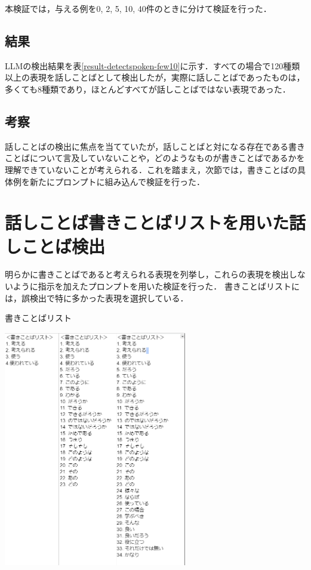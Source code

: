 本検証では，与える例を0, 2, 5, 10, 40件のときに分けて検証を行った．

\subsection{結果}
LLMの検出結果を表\ref{result-detectspoken-few10}に示す．すべての場合で120種類以上の表現を話しことばとして検出したが，実際に話しことばであったものは，多くても8種類であり，ほとんどすべてが話しことばではない表現であった．



\subsection{考察}
話しことばの検出に焦点を当てていたが，話しことばと対になる存在である書きことばについて言及していないことや，どのようなものが書きことばであるかを理解できていないことが考えられる．これを踏まえ，次節では，書きことばの具体例を新たにプロンプトに組み込んで検証を行った．

\section{話しことば書きことばリストを用いた話しことば検出 \label{c7s2}}
明らかに書きことばであると考えられる表現を列挙し，これらの表現を検出しないように指示を加えたプロンプトを用いた検証を行った．
書きことばリストには，誤検出で特に多かった表現を選択している．

\begin{table}[H]
	\centering
        \caption{書きことばリスト}
 	\includegraphics[width=80mm]{image/image-klistTable.png}
	\label{klistTable}
\end{table}

